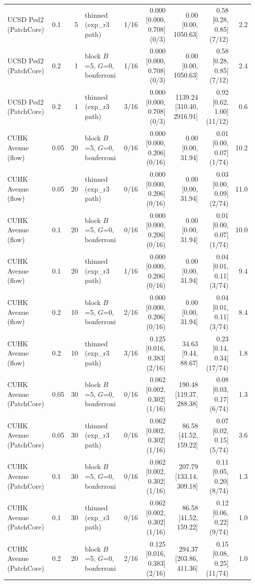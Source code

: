 \begin{table}[t]
{\begin{tabular}{llrlrrrrr}
UCSD Ped2 (PatchCore) & 0.1 & 5 & thinned (exp_r3 path) & 1/16 & 0.000 [0.000, 0.708] (0/3) & 0.00 [0.00, 1050.63] & 0.58 [0.28, 0.85] (7/12) & 2.2 \\
UCSD Ped2 (PatchCore) & 0.2 & 1 & block $B$=5, $G$=0, bonferroni & 1/16 & 0.000 [0.000, 0.708] (0/3) & 0.00 [0.00, 1050.63] & 0.58 [0.28, 0.85] (7/12) & 2.4 \\
UCSD Ped2 (PatchCore) & 0.2 & 1 & thinned (exp_r3 path) & 3/16 & 0.000 [0.000, 0.708] (0/3) & 1139.24 [310.40, 2916.91] & 0.92 [0.62, 1.00] (11/12) & 0.6 \\
CUHK Avenue (flow) & 0.05 & 20 & block $B$=5, $G$=0, bonferroni & 0/16 & 0.000 [0.000, 0.206] (0/16) & 0.00 [0.00, 31.94] & 0.01 [0.00, 0.07] (1/74) & 10.2 \\
CUHK Avenue (flow) & 0.05 & 20 & thinned (exp_r3 path) & 0/16 & 0.000 [0.000, 0.206] (0/16) & 0.00 [0.00, 31.94] & 0.03 [0.00, 0.09] (2/74) & 11.0 \\
CUHK Avenue (flow) & 0.1 & 20 & block $B$=5, $G$=0, bonferroni & 0/16 & 0.000 [0.000, 0.206] (0/16) & 0.00 [0.00, 31.94] & 0.01 [0.00, 0.07] (1/74) & 10.0 \\
CUHK Avenue (flow) & 0.1 & 20 & thinned (exp_r3 path) & 1/16 & 0.000 [0.000, 0.206] (0/16) & 0.00 [0.00, 31.94] & 0.04 [0.01, 0.11] (3/74) & 9.4 \\
CUHK Avenue (flow) & 0.2 & 10 & block $B$=5, $G$=0, bonferroni & 2/16 & 0.000 [0.000, 0.206] (0/16) & 0.00 [0.00, 31.94] & 0.04 [0.01, 0.11] (3/74) & 8.4 \\
CUHK Avenue (flow) & 0.2 & 10 & thinned (exp_r3 path) & 3/16 & 0.125 [0.016, 0.383] (2/16) & 34.63 [9.44, 88.67] & 0.23 [0.14, 0.34] (17/74) & 1.8 \\
CUHK Avenue (PatchCore) & 0.05 & 30 & block $B$=5, $G$=0, bonferroni & 0/16 & 0.062 [0.002, 0.302] (1/16) & 190.48 [119.37, 288.38] & 0.08 [0.03, 0.17] (6/74) & 1.3 \\
CUHK Avenue (PatchCore) & 0.05 & 30 & thinned (exp_r3 path) & 0/16 & 0.062 [0.002, 0.302] (1/16) & 86.58 [41.52, 159.22] & 0.07 [0.02, 0.15] (5/74) & 3.6 \\
CUHK Avenue (PatchCore) & 0.1 & 30 & block $B$=5, $G$=0, bonferroni & 0/16 & 0.062 [0.002, 0.302] (1/16) & 207.79 [133.14, 309.18] & 0.11 [0.05, 0.20] (8/74) & 1.3 \\
CUHK Avenue (PatchCore) & 0.1 & 30 & thinned (exp_r3 path) & 0/16 & 0.062 [0.002, 0.302] (1/16) & 86.58 [41.52, 159.22] & 0.12 [0.06, 0.22] (9/74) & 1.0 \\
CUHK Avenue (PatchCore) & 0.2 & 20 & block $B$=5, $G$=0, bonferroni & 2/16 & 0.125 [0.016, 0.383] (2/16) & 294.37 [203.86, 411.36] & 0.15 [0.08, 0.25] (11/74) & 1.0 \\

\end{tabular}}
\end{table}
